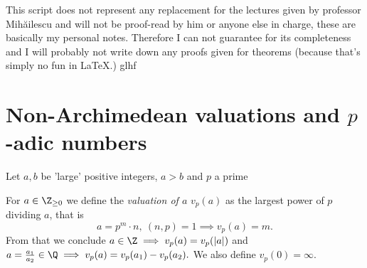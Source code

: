 \documentclass{jvfscript}
\begin{document}
	\frontmatter
	\maketitle
	
\tableofcontents
\newpage
\thispagestyle{plain}
This script does not represent any replacement for the lectures given by professor Mih\u{a}ilescu and will not be proof-read by him or anyone else in charge, these are basically my personal notes. Therefore I can not guarantee for its completeness and I will probably not write down any proofs given for theorems (because that's simply no fun in \LaTeX.)\hspace{\fill} glhf
\newpage
\mainmatter	
{}			%
	
	
	\section{Non-Archimedean valuations and $p$-adic numbers}
		Let $a,b$ be 'large' positive integers, $a > b$ and $p$ a prime
	\begin{defn}[Valuation]
		For $a \in \Z_{\geq 0}$ we define the \emph{valuation of $a$} $v_p(a)$ as the largest power of $p$ dividing $a$, that is
		\[ a = p^m \cdot n,\ (n,p) = 1 \implies v_p(a) = m. \]
		From that we conclude $ a \in \Z \implies v_p(a) = v_p(|a|) $ and $ a = \frac{a_1}{a_2} \in \Q \implies v_p(a) = v_p(a_1) - v_p(a_2). $ We also define $ v_p(0) = \infty $.
	\end{defn}
	
\end{document}
